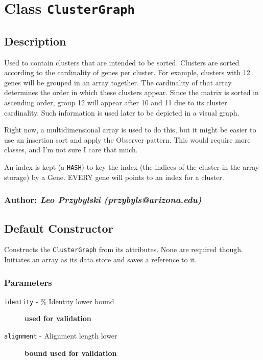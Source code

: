 
\section{Class \texttt{ClusterGraph}\label{Class_ClusterGraph}}
\subsection*{Description\label{Description}}


Used to contain clusters that are intended to be sorted. Clusters
are sorted according to the cardinality of genes per cluster. For 
example, clusters with 12 genes will be grouped in an array together.
The cardinality of that array determines the order in which these
clusters appear. Since the matrix is sorted in ascending order,
group 12 will appear after 10 and 11 due to its cluster cardinality.
Such information is used later to be depicted in a visual graph.



Right now, a multidimensional array is used to do this, but it might
be easier to use an insertion sort and apply the Observer pattern.
This would require more classes, and I'm not sure I care that much.



An index is kept (a \texttt{HASH}) to key the index (the indices of the cluster
in the array storage) by a Gene. EVERY gene will points to an index
for a cluster.

\subsubsection*{Author: \textit{Leo Przybylski (przybyls@arizona.edu)}\label{Author:_Leo_Przybylski_przybyls_arizona_edu_}}
\subsection*{Default Constructor\label{Default_Constructor}}


Constructs the \texttt{ClusterGraph} from its attributes. None are required though. 
Initiates an array as its data store and saves a reference to it.

\subsubsection*{Parameters\label{Parameters}}
\begin{description}

\item[{\texttt{identity} - \% Identity lower bound}] \textbf{used for validation}
\item[{\texttt{alignment} - Alignment length lower}] \textbf{bound used for validation}\end{description}
